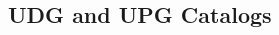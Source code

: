 \documentclass[twocolumn,astrosymb,twocolappendix]{aastex631}
\newcommand{\sersic}{S\'ersic}
\begin{document}
\begin{CJK*}{UTF8}{gbsn}





\section{UDG and UPG Catalogs}
\onecolumngrid 


\end{CJK*}
\end{document}

